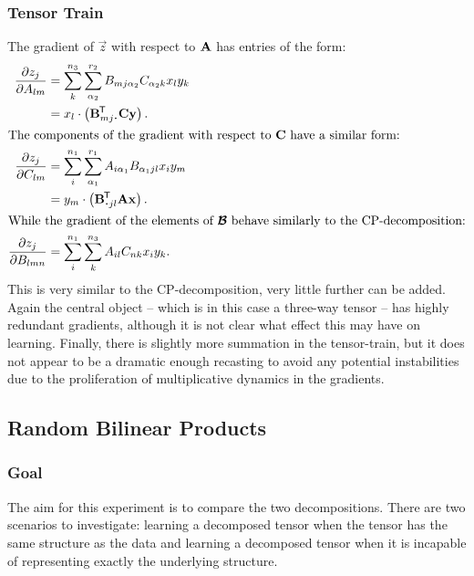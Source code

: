 \subsubsection{Tensor Train}
The gradient of \(\vec{z}\) with respect to \(\mathbf{A}\) has entries of the form:
\begin{align}
	\frac{\partial z_j}{\partial A_{lm}} 
	    &= \sum_{k}^{n_3}
		\sum_{\alpha_2}^{r_2}B_{m j\alpha_2}C_{\alpha_2k}x_ly_k\\
		&= x_l \cdot \left(\tran{\vec{B}_{mj\midbullet}}\mat{C}\vec{y}\right). \\
\intertext{The components of the gradient with respect to \(\mat{C}\) have a similar form:}
	\frac{\partial z_j}{\partial C_{lm}} 
		&= \sum_{i}^{n_1}
		\sum_{\alpha_1}^{r_1}A_{i\alpha_1}B_{\alpha_1jl}x_iy_m \\
		&= y_m \cdot \left(\tran{\vec{B}_{\midbullet jl}}\mat{A}\vec{x}\right). \\
\intertext{While the gradient of the elements of \(\tensor{B}\) behave similarly
	to the CP-decomposition:}
	\frac{\partial z_j}{\partial B_{lmn}} 
		&= \sum_{i}^{n_1}\sum_{k}^{n_3}
		A_{il}C_{nk}x_iy_k. \\
\end{align}
This is very similar to the CP-decomposition, very little further can be added. Again the central
object -- which is in this case a three-way tensor -- has highly redundant gradients, although it
is not clear what effect this may have on learning. Finally, there is slightly more summation
in the tensor-train, but it does not appear to be a dramatic enough recasting to avoid any
potential instabilities due to the proliferation of multiplicative dynamics in the gradients.



\subsection{Random Bilinear Products}\label{sec:randbilin}
\subsubsection{Goal}
The aim for this experiment is to compare the two decompositions. There are two scenarios to
investigate: learning a decomposed tensor when the tensor has the same structure as the data and
learning a decomposed tensor when it is incapable of representing exactly the underlying structure. 

